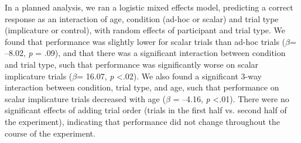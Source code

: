 \documentclass[man]{apa2}
\begin{document}
In a planned analysis, we ran a logistic mixed effects model, predicting a correct response as an interaction of age, condition (ad-hoc or scalar) and trial type (implicature or control), with random effects of participant and trial type. We found that performance was slightly lower for scalar trials than ad-hoc trials ($\beta$= --8.02, \textit{p} = .09), and that there was a significant interaction between condition and trial type, such that performance was significantly worse on scalar implicature trials ($\beta$= 16.07, \textit{p} \textless  .02). We also found a significant 3-way interaction between condition, trial type, and age, such that performance on scalar implicature trials decreased with age ($\beta$ = --4.16, \textit{p} \textless  .01). There were no significant effects of adding trial order (trials in the first half vs. second half of the experiment), indicating that performance did not change throughout the course of the experiment. 

 \begin{figure}[!h]
 	\centering
           \begin{floatrow}
           \end{floatrow}
\end{figure}	
\end{document}
